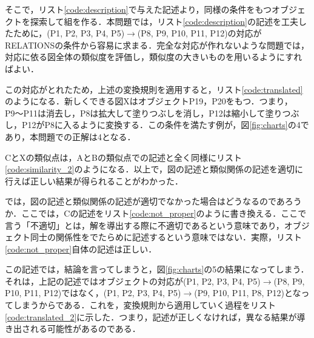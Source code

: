 \documentclass{jarticle}
\begin{document}
そこで，リスト\ref{code:description}で与えた記述より，同様の条件をもつオブジェクトを探索して組を作る．本問題では，リスト\ref{code:description}の記述を工夫したために，(P1, P2, P3, P4, P5)$\to$(P8, P9, P10, P11, P12)の対応がRELATIONSの条件から容易に求まる．完全な対応が作れないような問題では，対応に依る図全体の類似度を評価し，類似度の大きいものを用いるようにすればよい．

この対応がとれたため，上述の変換規則を適用すると，リスト\ref{code:translated}のようになる．新しくできる図XはオブジェクトP19，P20をもつ．つまり，P9〜P11は消去し，P8は拡大して塗りつぶしを消し，P12は縮小して塗りつぶし，P12がP8に入るように変換する．この条件を満たす例が，図\ref{fig:charts}の4であり，本問題での正解は4となる．
\lstset{style=customplain}




CとXの類似点は，AとBの類似点での記述と全く同様にリスト\ref{code:similarity_2}のようになる．以上で，図の記述と類似関係の記述を適切に行えば正しい結果が得られることがわかった．
\lstset{style=customplain}






では，図の記述と類似関係の記述が適切でなかった場合はどうなるのであろうか．ここでは，Cの記述をリスト\ref{code:not_proper}のように書き換える．ここで言う「不適切」とは，解を導出する際に不適切であるという意味であり，オブジェクト同士の関係性をでたらめに記述するという意味ではない．実際，リスト\ref{code:not_proper}自体の記述は正しい．
\lstset{style=customplain}




この記述では，結論を言ってしまうと，図\ref{fig:charts}の5の結果になってしまう．それは，上記の記述ではオブジェクトの対応が(P1, P2, P3, P4, P5)$\to$(P8, P9, P10, P11, P12)ではなく，(P1, P2, P3, P4, P5)$\to$(P9, P10, P11, P8, P12)となってしまうからである．これを，変換規則から適用していく過程をリスト\ref{code:translated_2}に示した．つまり，記述が正しくなければ，異なる結果が導き出される可能性があるのである．
\lstset{style=customplain}

\end{document}
